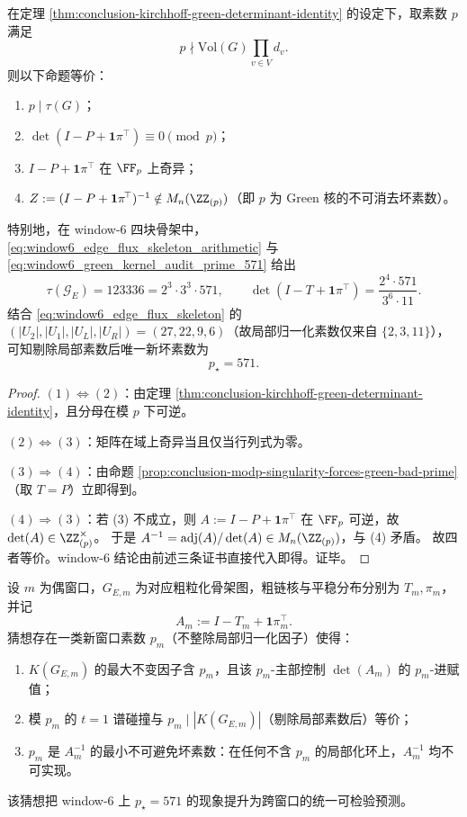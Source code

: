 \begin{corollary}\label{cor:conclusion-critical-group-torsion-green-bad-prime-equivalence}
在定理 \ref{thm:conclusion-kirchhoff-green-determinant-identity} 的设定下，取素数 \(p\) 满足
\[
p\nmid \mathrm{Vol}(G)\prod_{v\in V}d_v.
\]
则以下命题等价：
\begin{enumerate}
  \item \(p\mid \tau(G)\)；
  \item \(\det(I-P+\mathbf 1\pi^{\!\top})\equiv 0\pmod p\)；
  \item \(I-P+\mathbf 1\pi^{\!\top}\) 在 \(\FF_p\) 上奇异；
  \item \(Z:=(I-P+\mathbf 1\pi^{\!\top})^{-1}\notin M_n(\ZZ_{(p)})\)（即 \(p\) 为 Green 核的不可消去坏素数）。
\end{enumerate}
特别地，在 window-\(6\) 四块骨架中，\eqref{eq:window6_edge_flux_skeleton_arithmetic} 与 \eqref{eq:window6_green_kernel_audit_prime_571} 给出
\[
\tau(\mathcal G_E)=123336=2^3\cdot 3^3\cdot 571,\qquad
\det(I-T+\mathbf 1\pi^{\!\top})=\frac{2^4\cdot 571}{3^6\cdot 11}.
\]
结合 \eqref{eq:window6_edge_flux_skeleton} 的 \((|U_2|,|U_1|,|U_L|,|U_R|)=(27,22,9,6)\)（故局部归一化素数仅来自 \(\{2,3,11\}\)），可知剔除局部素数后唯一新坏素数为
\[
p_\star=571.
\]
\end{corollary}
\begin{proof}
\((1)\Leftrightarrow(2)\)：由定理 \ref{thm:conclusion-kirchhoff-green-determinant-identity}，且分母在模 \(p\) 下可逆。

\((2)\Leftrightarrow(3)\)：矩阵在域上奇异当且仅当行列式为零。

\((3)\Rightarrow(4)\)：由命题 \ref{prop:conclusion-modp-singularity-forces-green-bad-prime}（取 \(T=P\)）立即得到。

\((4)\Rightarrow(3)\)：若 (3) 不成立，则 \(A:=I-P+\mathbf 1\pi^{\!\top}\) 在 \(\FF_p\) 可逆，故 \(\det(A)\in \ZZ_{(p)}^\times\)。
于是
\(
A^{-1}=\operatorname{adj}(A)/\det(A)\in M_n(\ZZ_{(p)})
\)，与 (4) 矛盾。
故四者等价。window-\(6\) 结论由前述三条证书直接代入即得。证毕。
\end{proof}

\begin{conjecture}\label{conj:conclusion-tree-torsion-spectral-collision-green-bad-prime-rigidity}
设 \(m\) 为偶窗口，\(G_{E,m}\) 为对应粗粒化骨架图，粗链核与平稳分布分别为 \(T_m,\pi_m\)，并记
\[
A_m:=I-T_m+\mathbf 1\pi_m^{\!\top}.
\]
猜想存在一类新窗口素数 \(p_m\)（不整除局部归一化因子）使得：
\begin{enumerate}
  \item \(K(G_{E,m})\) 的最大不变因子含 \(p_m\)，且该 \(p_m\)-主部控制 \(\det(A_m)\) 的 \(p_m\)-进赋值；
  \item 模 \(p_m\) 的 \(t=1\) 谱碰撞与 \(p_m\mid |K(G_{E,m})|\)（剔除局部素数后）等价；
  \item \(p_m\) 是 \(A_m^{-1}\) 的最小不可避免坏素数：在任何不含 \(p_m\) 的局部化环上，\(A_m^{-1}\) 均不可实现。
\end{enumerate}
该猜想把 window-\(6\) 上 \(p_\star=571\) 的现象提升为跨窗口的统一可检验预测。
\end{conjecture}

\endinput
